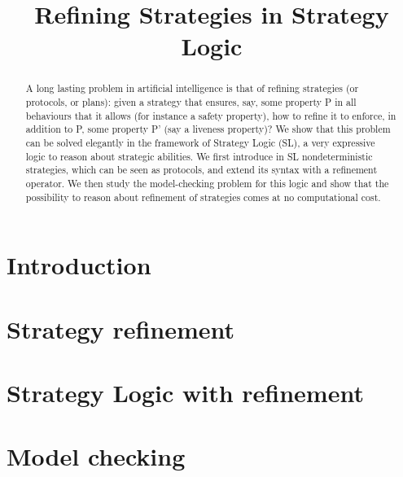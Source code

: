 \documentclass{article}
\title{Refining Strategies in Strategy Logic}
\author{
%
%
%
}
\theoremstyle{definition}
\theoremstyle{plain}
\begin{document}
\maketitle

\begin{abstract}
  A long lasting problem in artificial intelligence is that of
  refining strategies (or protocols, or plans): given a strategy that ensures, say, some
  property P in all behaviours that it allows (for instance a safety
  property), how to refine it to enforce, in addition to P, some
  property P' (say a liveness property)? We show that this problem can
  be solved elegantly in the framework of Strategy Logic (SL), a very
  expressive logic to reason about strategic abilities. We first
  introduce in SL nondeterministic strategies, which can be seen as
  protocols, and extend its syntax with a refinement operator. We then
  study the model-checking problem for this logic and show that the
  possibility to reason about refinement of strategies comes at no
  computational cost.
\end{abstract}

\section{Introduction}
\label{section:introduction}


\section{Strategy refinement}
\label{section:refinement}

\section{Strategy Logic with refinement}
\label{section:SL}


\section{Model checking \SLref}
\label{section:mc}




\end{document}
